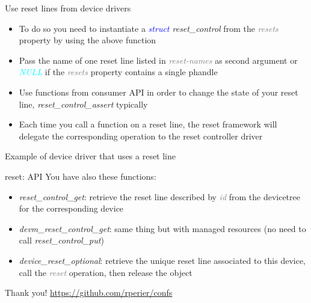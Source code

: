 \documentclass{beamer}
\begin{document}
\begin{frame}{Use reset lines from device drivers}
	
	\begin{itemize}
		\item To do so you need to instantiate a \textit{\textcolor{blue}{struct} reset\_control} from the \textit{\textcolor{gray}{resets}} property by using the above function
		\item Pass the name of one reset line listed in \textit{\textcolor{gray}{reset-names}} as second argument or \textit{\textcolor{cyan}{NULL}} if the \textit{\textcolor{gray}{resets}} property contains a single phandle 
		\item Use functions from consumer API in order to change the state of your reset line, \textit{reset\_control\_assert} typically
		\item Each time you call a function on a reset line, the reset framework will delegate the corresponding operation to the reset controller driver
	\end{itemize}
\end{frame}

\begin{frame}{Example of device driver that uses a reset line}
	
\end{frame}

\begin{frame}{reset: API}
	You have also these functions:
	\begin{itemize}
		
	\item \textit{reset\_control\_get}: retrieve the reset line described by \textit{\textcolor{gray}{id}} from the devicetree for the corresponding device
		\item \textit{devm\_reset\_control\_get}: same thing but with managed resources (no need to call \textit{reset\_control\_put})
		\item \textit{device\_reset\_optional}: retrieve the unique reset line associated to this device, call the \textit{\textcolor{gray}{reset}} operation, then release the object
	\end{itemize}
\end{frame}

\begin{frame}{Thank you!}
	\vfill
	\vfill
	\url{https://github.com/rperier/confs}
\end{frame}
\end{document}
